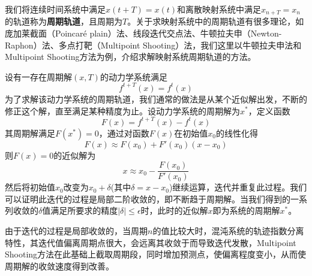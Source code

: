 我们将连续时间系统中满足$x(t+T)=x(t)$和离散映射系统中满足$x_{n+T}=x_n$的轨道称为\textbf{周期轨道}，且周期为$T$。关于求映射系统中的周期轨道有很多理论，如庞加莱截面（Poincar\'{e} plain）法\cite{viswanath2001lindstedt}、线段迭代交点法\cite{gao1994resonances}、牛顿拉夫申（Newton-Raphon）法\cite{marcinek1994numerical}、多点打靶（Multipoint Shooting）法\cite{yang2009locating}，我们这里以牛顿拉夫申法和Multipoint Shooting方法为例，介绍求解映射系统周期轨道的方法。

设有一存在周期解$(x,T)$的动力学系统满足
\begin{equation}
    f^{t+T}(x)=f^t(x)
\end{equation}
为了求解该动力学系统的周期轨道，我们通常的做法是从某个近似解出发，不断的修正这个解，直至满足某种精度为止。设动力学系统的周期解为$x^*$，定义函数
\begin{equation}
    F(x)=f^{t+T}(x)-f^{t}(x)
\end{equation}
其周期解满足$F(x^*)=0$，通过对函数$F(x)$在初始值$x_0$的线性化得
\begin{equation}
    F(x)\approx F(x_0)+F'(x_0)(x-x_0)
\end{equation}
则$F(x)=0$的近似解为
\begin{equation}
    x\approx x_0-\dfrac{F(x_0)}{F'(x_0)}
\end{equation}
然后将初始值$x_0$改变为$x_0+\delta$(其中$\delta=x-x_0$)继续运算，迭代并重复此过程。我们可以证明此迭代的过程是局部二阶收敛的，即不断趋于周期解。当我们得到的一系列收敛的$\delta$值满足所要求的精度$|\delta|\leqslant\epsilon$时，此时的近似解$x$即为系统的周期解$x^*$。

由于迭代的过程是局部收敛的，当周期$n$的值比较大时，混沌系统的轨迹指数分离特性，其迭代值偏离周期点很大，会远离其收敛于而导致迭代发散，Multipoint Shooting方法在此基础上截取周期段，同时增加预测点，使偏离程度变小，从而使周期解的收敛速度得到改善。

